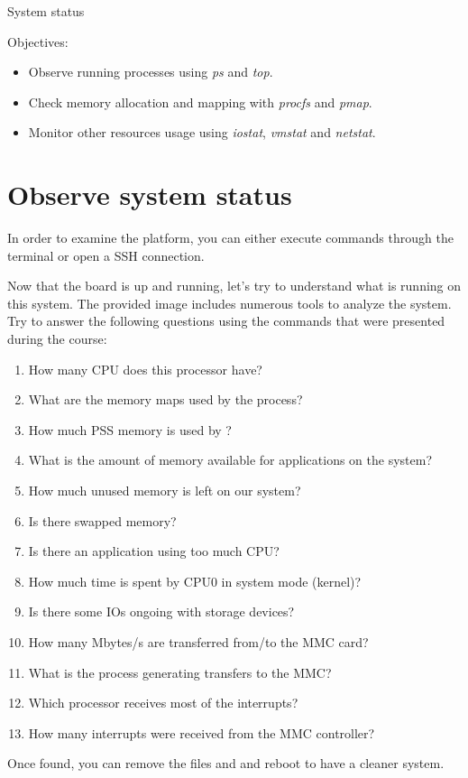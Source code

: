 \subchapter
{System status}
{Objectives:
  \begin{itemize}
    \item Observe running processes using {\em ps} and {\em top}.
    \item Check memory allocation and mapping with {\em procfs} and {\em pmap}.
    \item Monitor other resources usage using {\em iostat}, {\em vmstat} and {\em netstat}.
  \end{itemize}
}

\section{Observe system status}

In order to examine the platform, you can either execute commands through the
 terminal or open a SSH connection.

Now that the board is up and running, let's try to understand what is running
on this system. The provided image includes numerous tools to analyze the
system. Try to answer the following questions using the commands that were
presented during the course:

\begin{enumerate}
  \item How many CPU does this processor have?
  \item What are the memory maps used by the  process?
  \item How much PSS memory is used by ?
  \item What is the amount of memory available for applications on the system?
  \item How much unused memory is left on our system?
  \item Is there swapped memory?
  \item Is there an application using too much CPU?
  \item How much time is spent by CPU0 in system mode (kernel)?
  \item Is there some IOs ongoing with storage devices?
  \item How many Mbytes/s are transferred from/to the MMC card?
  \item What is the process generating transfers to the MMC?
  \item Which processor receives most of the interrupts?
  \item How many interrupts were received from the MMC controller?
\end{enumerate}

Once found, you can remove the files  and
 and reboot to have a cleaner system.
